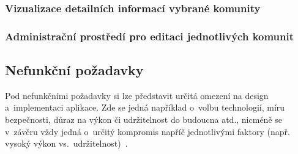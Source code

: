 \hypertarget{vizualizace-detailnuxedch-informacuxed-vybranuxe9-komunity}{%
\subsubsection*{Vizualizace detailních informací vybrané komunity}\label{vizualizace-detailnuxedch-informacuxed-vybranuxe9-komunity}}

\hypertarget{administraux10dnuxed-prostux159eduxed-pro-editaci-jednotlivuxfdch-komunit}{%
\subsubsection*{Administrační prostředí pro editaci jednotlivých komunit}\label{administraux10dnuxed-prostux159eduxed-pro-editaci-jednotlivuxfdch-komunit}}

\hypertarget{nefunkux10dnuxed-poux17eadavky}{%
\subsection{Nefunkční požadavky}\label{nefunkux10dnuxed-poux17eadavky}}

Pod nefunkčními požadavky si lze představit určitá omezení na design a~implementaci aplikace. Zde se jedná například o~volbu technologií, míru bezpečnosti, důraz na výkon či udržitelnost do budoucna atd., nicméně se v~závěru vždy jedná o~určitý kompromis napříč jednotlivými faktory (např. vysoký výkon vs.~udržitelnost)~\parencite{Gorton2006}.
